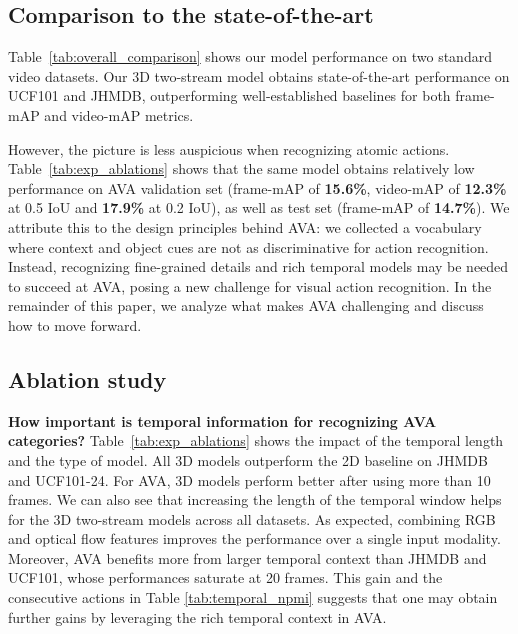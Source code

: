 \documentclass[10pt,twocolumn,letterpaper]{article}
\begin{document}
\subsection{Comparison to the state-of-the-art}

Table~\ref{tab:overall_comparison} shows our model performance on two standard video datasets. Our 3D two-stream model obtains state-of-the-art performance on UCF101 and JHMDB, outperforming well-established baselines for both frame-mAP and video-mAP metrics.

However, the picture is less auspicious when recognizing atomic actions. Table~\ref{tab:exp_ablations} shows that the same model obtains relatively low performance on AVA validation set (frame-mAP of \textbf{15.6\%}, video-mAP of \textbf{12.3\%} at 0.5 IoU and \textbf{17.9\%} at 0.2 IoU), as well as test set (frame-mAP of \textbf{14.7\%}). We attribute this to the design principles behind AVA: we collected a vocabulary where context and object cues are not as discriminative for action recognition. Instead, recognizing fine-grained details and rich temporal models may be needed to succeed at AVA, posing a new challenge for visual action recognition. In the remainder of this paper, we analyze what makes AVA challenging and discuss how to move forward. 

\subsection{Ablation study}

\noindent \textbf{How important is temporal information for recognizing AVA categories?} Table~\ref{tab:exp_ablations} shows the impact of the temporal length and the type of model. All 3D models outperform the 2D baseline on JHMDB and UCF101-24. For AVA, 3D models perform better after using more than 10 frames. We can also see that increasing the length of the temporal window helps for the 3D two-stream models across all datasets. As expected, combining RGB and optical flow features improves the performance over a single input modality.  Moreover, AVA benefits more from larger temporal context than JHMDB and UCF101, whose performances saturate at 20 frames. This gain and the consecutive actions in Table \ref{tab:temporal_npmi} suggests that one may obtain further gains by leveraging the rich temporal context in AVA. 
\end{document}
